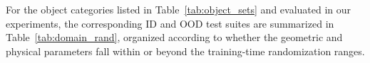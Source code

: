 For the object categories listed in Table~\ref{tab:object_sets} and evaluated in our experiments, the corresponding ID and OOD test suites are summarized in Table~\ref{tab:domain_rand}, organized according to whether the geometric and physical parameters fall within or beyond the training-time randomization ranges.


